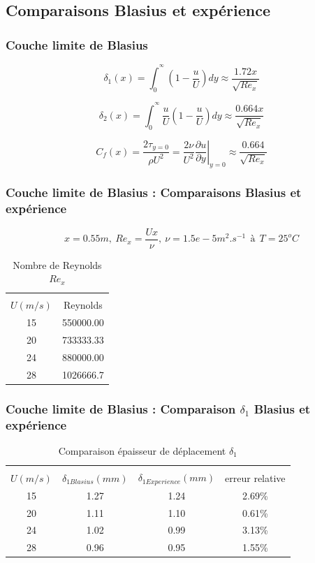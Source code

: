 \documentclass{beamer}
\begin{document}
\subsection{Comparaisons Blasius et expérience}\label{sec:comparaison}
\begin{frame}
\frametitle{Couche limite de Blasius}
\begin{equation}
	\delta_{1}(x) = 
	\int_{0}^{^\infty}
	\left(
	1 - 
	\frac{u}{U}
	\right)
	dy
	\approx \frac{1.72x}{\sqrt{Re_{x}}}
\end{equation}

\begin{equation}
	\delta_{2}(x) = 
	\int_{0}^{^\infty}
	\frac{u}{U}
	\left(
	1 - 
	\frac{u}{U}
	\right)
	dy
	\approx \frac{0.664x}{\sqrt{Re_{x}}}
\end{equation}

\begin{equation}
	C_{f}(x) =
	\frac{2\tau_{y=0}}{\rho U^{2}} =
	\frac{2\nu}{U^{2}}
	\left.
	\frac{\partial u}{\partial y}
	\right|_{y = 0} \approx \frac{0.664}{\sqrt{Re_{x}}}
\end{equation}
\end{frame}

\begin{frame}
\frametitle{Couche limite de Blasius : Comparaisons Blasius et expérience}
\begin{equation*}
	x = 0.55m,~Re_{x} = \frac{Ux}{\nu},~
	\nu = 1.5e-5 m^{2}.s^{-1}~~\text{à}~~T = 25^{o}C
\end{equation*}

\begin{table}[ht]
	\centering
	\begin{tabular}{cc}
		\hline\\
		$U(m/s)$ & Reynolds\\
		\hline
   15 & 550000.00\\
   20 & 733333.33\\
   24 & 880000.00\\
   28 & 1026666.7
	\end{tabular}
	\caption{Nombre de Reynolds $Re_{x}$}
\end{table}
\end{frame}

\begin{frame}
\frametitle{Couche limite de Blasius : Comparaison $\delta_{1}$ Blasius et expérience}
\begin{table}[ht]
	\centering
	\begin{tabular}{cccc}
		\hline\\
		$U(m/s)$ & $\delta_{1Blasius}(mm)$ &
		$ \delta_{1Experience}(mm)$ & 
		 erreur relative\\
		\hline
		15   & 1.27   & 1.24   & 2.69\%\\
		20   & 1.11   & 1.10   & 0.61\%\\
		24   & 1.02   & 0.99   & 3.13\%\\
		28   & 0.96   & 0.95   & 1.55\%
	\end{tabular}
	\caption{Comparaison épaisseur de déplacement $\delta_{1}$}
\end{table}
\end{frame}
\end{document}
